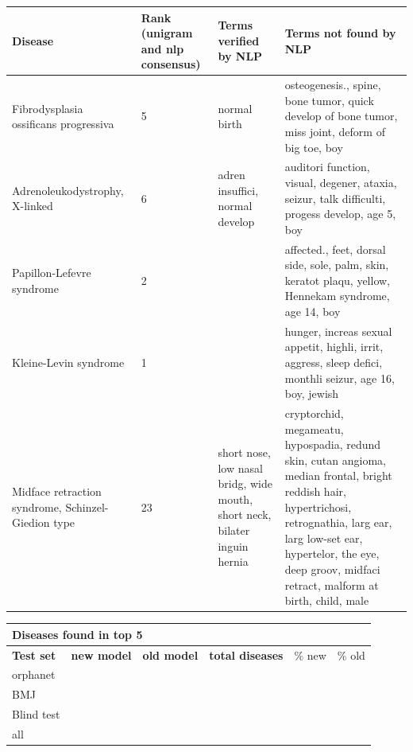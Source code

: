 \documentclass[10pt,letterpaper,final]{article}
\begin{document}
\begin{center}
\begin{small}
	\begin{longtable}{|p{3.5cm}|p{1.5cm}|p{3cm}|p{3cm}|}
	\hline
	\textbf{Disease}  & \textbf{Rank (unigram and nlp consensus)} & \textbf{Terms verified by NLP}  & \textbf{Terms not found by NLP} \\
	\hline\hline
Fibrodysplasia ossificans progressiva & 5 & normal birth & osteogenesis., spine, bone tumor, quick develop of bone tumor, miss joint, deform of big toe, boy \\ \hline
Adrenoleukodystrophy, X-linked & 6 & adren insuffici, normal develop & auditori function, visual, degener, ataxia, seizur, talk difficulti, progess develop, age 5, boy \\ \hline
Papillon-Lefevre syndrome & 2 &  & affected., feet, dorsal side, sole, palm, skin, keratot plaqu, yellow, Hennekam syndrome, age 14, boy \\ \hline
Kleine-Levin syndrome & 1 &  & hunger, increas sexual appetit, highli, irrit, aggress, sleep defici, monthli seizur, age 16, boy, jewish \\ \hline
Midface retraction syndrome, Schinzel-Giedion type & 23 & short nose, low nasal bridg, wide mouth, short neck, bilater inguin hernia & cryptorchid, megameatu, hypospadia, redund skin, cutan angioma, median frontal, bright reddish hair, hypertrichosi, retrognathia, larg ear, larg low-set ear, hypertelor, the eye, deep groov, midfaci retract, malform at birth, child, male \\ \hline
	\end{longtable}
\end{small}
\end{center}


\begin{center}
\begin{small}
\begin{tabular}{l|cc||ccc}
	\multicolumn{6}{l}{\textbf{Diseases found in top 5}} \\ \hline
\textbf{Test set} & \textbf{new model} &	\textbf{old model}	 &	\textbf{total diseases} &	\% new	 &\% old \\ \hline
orphanet    &       &      &       &      & \\
BMJ	        &       &      &       &      & \\
Blind test	&       &      &       &      & \\ \hline \hline
all	        &       &      &       &      & \\ \hline
\end{tabular}
\end{small}
\end{center}
\end{document}
